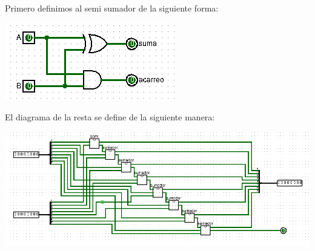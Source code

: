 \documentclass[answers]{exam}
\begin{document}
\begin{questions}
  \begin{solution}
    Primero definimos al semi sumador de la siguiente forma:
    \begin{center}
      \includegraphics[scale=0.5]{semi}
    \end{center}
    El diagrama de la resta se define de la siguiente manera:
    \begin{center}
      \includegraphics[width=\linewidth]{ejercicio7}
    \end{center}
  \end{solution}


\end{questions}
\end{document}
